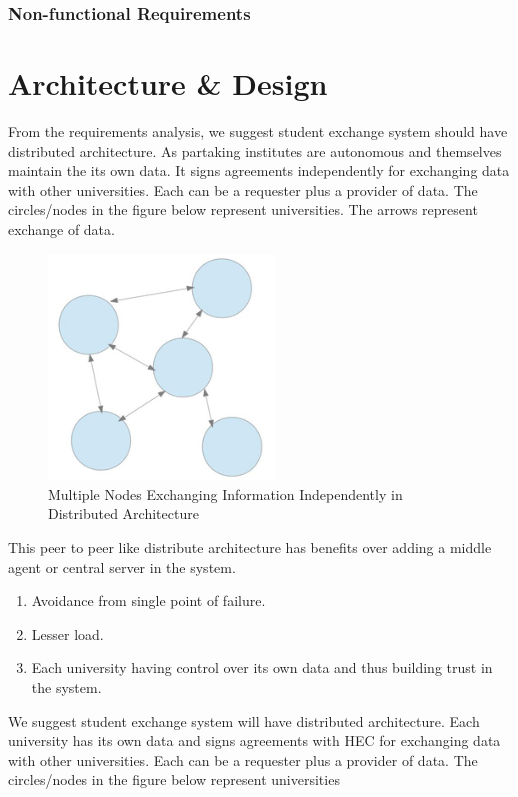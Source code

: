 \documentclass[12pt,a4paper,oneside]{book}
\begin{document}
    \subsection{Non-functional Requirements}


\chapter{Architecture \& Design}\label{ch-architecture-design}
From the requirements analysis, we suggest student exchange system should have distributed architecture. As partaking institutes are autonomous and themselves maintain the its own data. It signs agreements independently for exchanging data with other universities. Each can be a requester plus a provider of data. The circles/nodes in the figure below represent universities. The arrows represent exchange of data.

\begin{figure}[!htp]
  \centering
  \includegraphics[width=6cm]{architecture_distributed_independent_exchange.png}
  \caption{Multiple Nodes Exchanging Information Independently in Distributed Architecture \cite{The Mobility Project}}
  \label{fig:architecture_distributed_independent_exchange}
\end{figure}

This peer to peer like distribute architecture has benefits over adding a middle agent or central server in the system.

\begin{enumerate}
\item Avoidance from single point of failure.
\item Lesser load.
\item Each university having control over its own data and thus building trust in the system.	
\end{enumerate}

We suggest student exchange system will have distributed architecture. Each university has its own data and signs agreements with HEC for exchanging data with other universities. Each can be a requester plus a provider of data. The circles/nodes in the figure below represent universities
\end{document}

